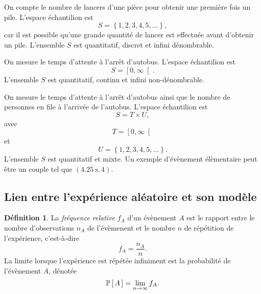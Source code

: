 \documentclass[11pt]{article}
\makeatletter
\renewcommand\P[1]{%
	\ensuremath{%
		\mathbb{P}\left[\,#1\,\right]%
	}%
}%
\theoremstyle{remark}
\theoremstyle{definition}
\newtheorem*{@definition}{Définition}
\newenvironment{definition}{%
	\begin{@definition}%
}{%
	\end{@definition}%
	\setcounter{property}{0}%
}
\makeatother
\begin{document}
\begin{exemple}
	On compte le nombre de lancers d'une pièce pour obtenir une première fois
	un pile. L'espace échantilion est
	\begin{equation*}
		S=\left\{1,2,3,4,5,\dots\right\},
	\end{equation*}
	car il est possible qu'une grande quantité de lancer est effectuée avant
	d'obtenir un pile. L'ensemble $S$ est quantitatif, discret et
	infini dénombrable.
\end{exemple}

\pagebreak
\begin{exemple}
	On mesure le temps d'attente à l'arrêt d'autobus. L'espace échantilion est
	\begin{equation*}
		S=\left[0,\infty\right[.
	\end{equation*}
	L'ensemble $S$ est quantitatif, continu et infini non-dénombrable.
\end{exemple}

\begin{exemple}
	On mesure le temps d'attente à l'arrêt d'autobus ainsi que le nombre de
	personnes en file à l'arrivée de l'autobus. L'espace échantilion est
	\begin{equation*}
		S=T\times U,
	\end{equation*}
	avec
	\begin{equation*}
		T=\left[0,\infty\right[
	\end{equation*}
	et
	\begin{equation*}
		U=\left\{1,2,3,4,5,\dots\right\}.
	\end{equation*}
	L'ensemble $S$ est quantitatif et mixte. Un exemple d'évènement élèmentaire
	peut être un couple tel que $\left(\SI{4.25}{\second}, 4\right)$.
\end{exemple}

\subsection{Lien entre l'expérience aléatoire et son modèle}
\begin{definition}
	La \textit{fréquence relative} $f_A$ d'un évènement $A$ est le rapport
	entre le nombre d'observations $n_A$ de l'évèmenent et le nombre $n$ de
	répétition de l'expérience, c'est-à-dire
	\begin{equation*}
		f_A=\frac{n_A}{n}.
	\end{equation*}
	La limite lorsque l'expérience est répétée infiniment est la probabilité de
	l'évènement $A$, dénotée
	\begin{equation*}
		\P{A}=\lim_{n\rightarrow\infty}f_A.
	\end{equation*}
\end{definition}
\end{document}
